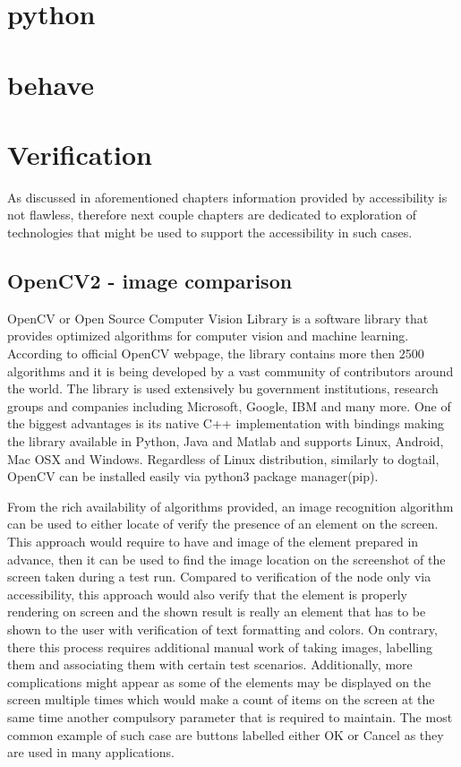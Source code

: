 \chapter{python}
\chapter{behave}
\chapter{Verification}
As discussed in aforementioned chapters information provided by accessibility is not flawless, therefore next couple chapters are dedicated to exploration of technologies that might be used to support the accessibility in such cases.

\section{OpenCV2 - image comparison}
OpenCV or Open Source Computer Vision Library is a software library that provides optimized algorithms for computer vision and machine learning. According to official OpenCV webpage\cite{opencv}, the library contains more then 2500 algorithms and it is being developed 
by a vast community of contributors around the world. The library is used extensively bu government institutions, research groups and companies including Microsoft, Google, IBM and many more. One of the biggest advantages is its native C++ implementation with bindings making the library available in Python, Java and Matlab and supports Linux, Android, Mac OSX and Windows. Regardless of Linux distribution, similarly to dogtail, OpenCV can be installed easily via python3 package manager(pip). 

From the rich availability of algorithms provided, an image recognition algorithm can be used to either locate of verify the presence of an element on the screen. This approach would require to have and image of the element prepared in advance, then it can be used to find the image location on the screenshot of the screen taken during a test run. Compared to verification of the node only via accessibility, this approach would also verify that the element is properly rendering on screen and the shown result is really an element that has to be shown to the user with verification of text formatting and colors. On contrary, there this process requires additional manual work of taking images, labelling them and associating them with certain test scenarios. Additionally, more complications might appear as some of the elements may be displayed on the screen multiple times which would make a count of items on the screen at the same time another compulsory parameter that is required to maintain. The most common example of such case are buttons labelled either OK or Cancel as they are used in many applications.

